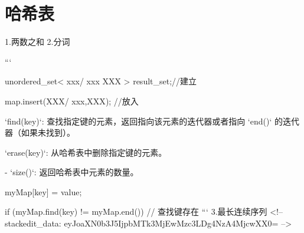 \chapter{哈希表}
1.两数之和
2.分词

```

unordered_set< xxx/ xxx XXX > result_set;//建立

map.insert(XXX/ {xxx,XXX}); //放入

`find(key)`: 查找指定键的元素，返回指向该元素的迭代器或者指向 `end()` 的迭代器（如果未找到）。

`erase(key)`: 从哈希表中删除指定键的元素。

-   `size()`: 返回哈希表中元素的数量。

myMap[key] = value;

if (myMap.find(key) != myMap.end()) {
    // 查找键存在
}
```
3.最长连续序列
<!--stackedit_data:
eyJoaXN0b3J5IjpbMTk3MjEwMzc3LDg4NzA4MjcwXX0=
-->